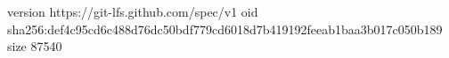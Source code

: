 version https://git-lfs.github.com/spec/v1
oid sha256:def4c95cd6c488d76dc50bdf779cd6018d7b419192feeab1baa3b017c050b189
size 87540
